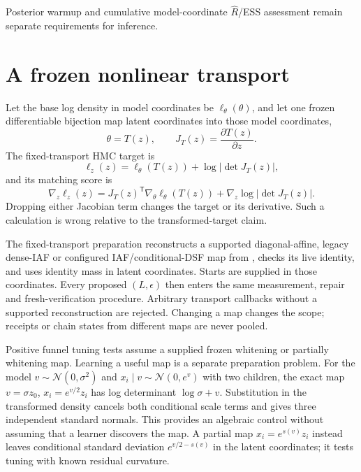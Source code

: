 Posterior warmup and cumulative model-coordinate $\widehat R$/ESS assessment
remain separate requirements for inference.

\section{A frozen nonlinear transport}

Let the base log density in model coordinates be
\(\ell_{\theta}(\theta)\), and let one frozen differentiable bijection map
latent coordinates into those model coordinates,
\[
  \theta = T(z), \qquad J_T(z)=\frac{\partial T(z)}{\partial z}.
\]
The fixed-transport HMC target is
\begin{equation}
  \ell_z(z)
  = \ell_{\theta}\!\left(T(z)\right)
    + \log\left|\det J_T(z)\right|,
  \label{eq:bf-fixed-transport-hmc-target}
\end{equation}
and its matching score is
\begin{equation}
  \nabla_z\ell_z(z)
  = J_T(z)^{\mathsf T}\nabla_{\theta}
      \ell_{\theta}\!\left(T(z)\right)
    + \nabla_z\log\left|\det J_T(z)\right|.
  \label{eq:bf-fixed-transport-hmc-score}
\end{equation}
Dropping either Jacobian term changes the target or its derivative.  Such a
calculation is wrong relative to the transformed-target claim.


The fixed-transport preparation reconstructs a supported diagonal-affine,
legacy dense-IAF or configured IAF/conditional-DSF map from
, checks its live identity,
and uses identity mass in latent coordinates. Starts are supplied in those
coordinates. Every proposed $(L,\epsilon)$ then enters the same measurement,
repair and fresh-verification procedure. Arbitrary transport callbacks without
a supported reconstruction are rejected. Changing a map changes the scope;
receipts or chain states from different maps are never pooled.

Positive funnel tuning tests assume a supplied frozen whitening or partially
whitening map. Learning a useful map is a separate preparation problem.
For the model $v\sim\mathcal N(0,\sigma^2)$ and
$x_i\mid v\sim\mathcal N(0,e^v)$ with two children, the exact map
$v=\sigma z_0$, $x_i=e^{v/2}z_i$ has log determinant
$\log\sigma+v$. Substitution in the transformed density cancels both
conditional scale terms and gives three independent standard normals.
This provides an algebraic control without assuming that a learner discovers
the map. A partial map $x_i=e^{s(v)}z_i$ instead leaves conditional standard
deviation $e^{v/2-s(v)}$ in the latent coordinates; it tests tuning with known
residual curvature.

